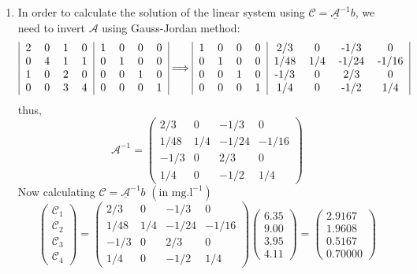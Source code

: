 \documentclass[12pts,a4paper,amsmath,amssymb,floatfix]{article}%
\begin{document}
\begin{enumerate}
\begin{enumerate}
\item In order to calculate the solution of the linear system using $\mathcal{C} = \underline{\mathcal{A}}^{-1}b$, we need to invert $\mathcal{A}$ using Gauss-Jordan method:
\begin{displaymath}
\begin{tabular}{| c c c c | c c c c |}
2 & 0 & 1 & 0 & 1 & 0 & 0 & 0 \\
0 & 4 & 1 & 1 & 0 & 1 & 0 & 0 \\
1 & 0 & 2 & 0 & 0 & 0 & 1 & 0 \\
0 & 0 & 3 & 4 & 0 & 0 & 0 & 1
\end{tabular} \Longrightarrow
\begin{tabular}{| c c c c | c c c c |}
1 & 0 & 0 & 0 & 2/3  & 0    & -1/3   & 0 \\
0 & 1 & 0 & 0 & 1/48 & 1/4  & -1/24  & -1/16 \\ 
0 & 0 & 1 & 0 & -1/3 & 0    & 2/3    & 0  \\
0 & 0 & 0 & 1 & 1/4  & 0    & -1/2   & 1/4
\end{tabular} 
\end{displaymath}
thus,
\begin{displaymath} 
\mathcal{A}^{-1}=
\begin{pmatrix}
2/3  & 0    & -1/3   & 0 \\
1/48 & 1/4  & -1/24  & -1/16 \\ 
-1/3 & 0    & 2/3    & 0  \\
1/4  & 0    & -1/2   & 1/4
\end{pmatrix}
\end{displaymath}
Now calculating $\mathcal{C} = \underline{\mathcal{A}}^{-1}b$ $\left(\text{in mg.l}^{-1}\right)$
\begin{displaymath} 
\begin{pmatrix}
\mathcal{C}_{1} \\ \mathcal{C}_{2} \\ \mathcal{C}_{3} \\ \mathcal{C}_{4} 
\end{pmatrix}=
\begin{pmatrix}
2/3  & 0    & -1/3   & 0 \\
1/48 & 1/4  & -1/24  & -1/16 \\ 
-1/3 & 0    & 2/3    & 0  \\
1/4  & 0    & -1/2   & 1/4
\end{pmatrix}
\begin{pmatrix}
6.35 \\ 9.00 \\ 3.95 \\ 4.11 
\end{pmatrix}=
\begin{pmatrix}
2.9167 \\ 1.9608 \\0.5167  \\ 0.70000 
\end{pmatrix}
\end{displaymath}

\end{enumerate}





\end{enumerate}
\end{document}
